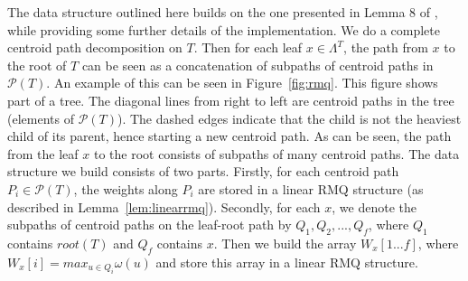 \documentclass[12pt,a4paper]{article}
\newcommand{\leafset}{\Lambda}
\newcommand{\weight}{\omega}
\begin{document}
    The data structure outlined here builds on the one presented in Lemma 8 of \cite{jansson2018algorithms}, while providing some further details of the implementation. We do a complete centroid path decomposition on $T$. Then for each leaf $x \in \leafset^T$, the path from $x$ to the root of $T$ can be seen as a concatenation of subpaths of centroid paths in $\mathcal{P}(T)$. An example of this can be seen in Figure~\ref{fig:rmq}. This figure shows part of a tree. The diagonal lines from right to left are centroid paths in the tree (elements of $\mathcal{P}(T)$). The dashed edges indicate that the child is not the heaviest child of its parent, hence starting a new centroid path. As can be seen, the path from the leaf $x$ to the root consists of subpaths of many centroid paths. The data structure we build consists of two parts. Firstly, for each centroid path $P_i \in \mathcal{P}(T)$, the weights along $P_i$ are stored in a linear RMQ structure (as described in Lemma~\ref{lem:linearrmq}). Secondly, for each $x$, we denote the subpaths of centroid paths on the leaf-root path by $Q_1, Q_2, ..., Q_f$, where $Q_1$ contains $root(T)$ and $Q_f$ contains $x$. Then we build the array $W_x[1 ... f]$, where $W_x[i] = max_{u \in Q_i} \weight(u)$ and store this array in a linear RMQ structure.
    \newline
\end{document}
